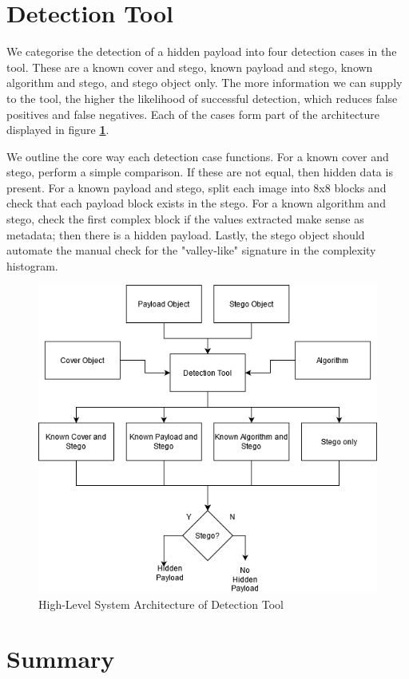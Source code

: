 \documentclass{l4proj}
\begin{document}
\section{Detection Tool}\label{detection_design}

We categorise the detection of a hidden payload into four detection cases in the tool. These are a known cover and stego, known payload and stego, known algorithm and stego, and stego object only. The more information we can supply to the tool, the higher the likelihood of successful detection, which reduces false positives and false negatives. Each of the cases form part of the architecture displayed in figure \textbf{\ref{fig:hlsa_detection_tool}}.

We outline the core way each detection case functions. For a known cover and stego, perform a simple comparison. If these are not equal, then hidden data is present. For a known payload and stego, split each image into 8x8 blocks and check that each payload block exists in the stego. For a known algorithm and stego, check the first complex block if the values extracted make sense as metadata; then there is a hidden payload. Lastly, the stego object should automate the manual check for the "valley-like" signature in the complexity histogram.

\begin{figure}[]
    \centering
    \includegraphics[width=0.8\linewidth]{images/detection_tool_architecture.png}    
    \caption{High-Level System Architecture of Detection Tool}
    \label{fig:hlsa_detection_tool} 
\end{figure}

\section{Summary} 
\end{document}
